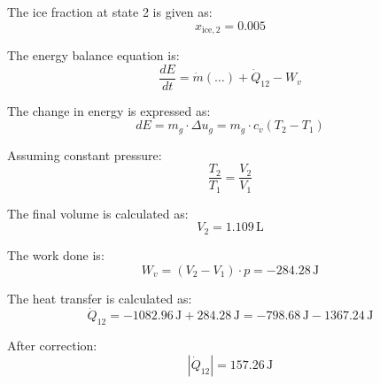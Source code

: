 The ice fraction at state 2 is given as:  
\[
x_{\text{ice},2} = 0.005
\]  

The energy balance equation is:  
\[
\frac{dE}{dt} = \dot{m} (\ldots) + \dot{Q}_{12} - W_v
\]  

The change in energy is expressed as:  
\[
dE = m_g \cdot \Delta u_g = m_g \cdot c_v (T_2 - T_1)
\]  

Assuming constant pressure:  
\[
\frac{T_2}{T_1} = \frac{V_2}{V_1}
\]  

The final volume is calculated as:  
\[
V_2 = 1.109 \, \text{L}
\]  

The work done is:  
\[
W_v = (V_2 - V_1) \cdot p = -284.28 \, \text{J}
\]  

The heat transfer is calculated as:  
\[
\dot{Q}_{12} = -1082.96 \, \text{J} + 284.28 \, \text{J} = -798.68 \, \text{J} - 1367.24 \, \text{J}
\]  

After correction:  
\[
|\dot{Q}_{12}| = 157.26 \, \text{J}
\]